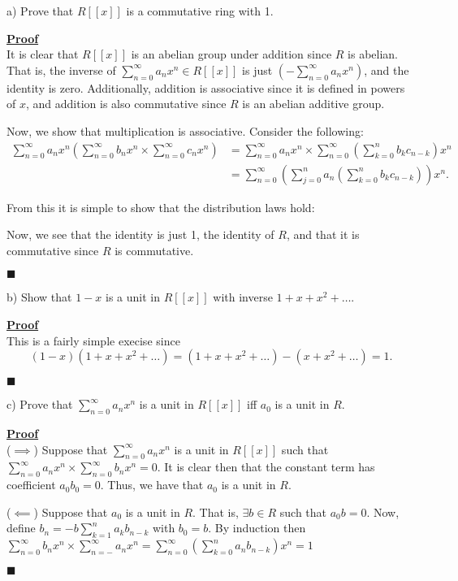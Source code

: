 \documentclass[12pt,a4paper]{article}
\newenvironment{proof}
{
\textbf{\underline{Proof}} \\
}
{
\begin{flushright}
$\blacksquare$
\end{flushright}}
\begin{document}
a) Prove that $R[[x]]$ is a commutative ring with 1.

\begin{proof}
    It is clear that $R[[x]]$ is an abelian group under addition since $R$ is abelian.
    That is, the inverse of $\sum_{n=0}^{\infty} a_n x^n \in R[[x]]$ is just $(-\sum_{n=0}^{\infty} a_n x^n)$, and the identity is zero. 
    Additionally, addition is associative since it is defined in powers of $x$, and addition is also commutative since $R$ is an abelian additive group.

    Now, we show that multiplication is associative.
    Consider the following:
    \begin{align*}
        \sum_{n=0}^{\infty} a_n x^n\left( \sum_{n=0}^{\infty} b_{n}x^{n} \times \sum_{n=0}^{\infty} c_{n}x^{n} \right) &= \sum_{n=0}^{\infty} a_n x^n \times \sum_{n=0}^{\infty} \left( \sum_{k=0}^{n} b_{k}c_{n-k} \right) x^{n} \\
        &= \sum_{n=0}^{\infty} \left( \sum_{j=0}^{n} a_n \left( \sum_{k=0}^{n} b_{k}c_{n-k} \right) \right) x^{n}
    .\end{align*}

    From this it is simple to show that the distribution laws hold:

    Now, we see that the identity is just 1, the identity of $R$, and that it is commutative since $R$ is commutative.
\end{proof}

b) Show that $1-x$ is a unit in $R[[x]]$ with inverse $1 + x + x^2 + \ldots$.

\begin{proof}
    This is a fairly simple execise since
    \[
        \left( 1-x \right)\left( 1 + x + x^2 + \ldots \right) = \left( 1 + x + x^2 + \ldots \right) - \left( x + x^2 + \ldots \right) = 1
    .\]
\end{proof}

c) Prove that $\sum_{n=0}^{\infty} a_n x^n$ is a unit in $R[[x]]$ iff $a_0$ is a unit in $R$.

\begin{proof}
    ($\implies$) Suppose that $\sum_{n=0}^{\infty} a_n x^n$ is a unit in $R[[x]]$ such that $\sum_{n=0}^{\infty} a_n x^n \times \sum_{n=0}^{\infty} b_{n}x^{n} = 0$. 
    It is clear then that the constant term has coefficient $a_0b_0 = 0$. 
    Thus, we have that $a_0$ is a unit in $R$.


    ($\impliedby$) Suppose that $a_0$ is a unit in $R$. 
    That is, $\exists b \in R$ such that $a_0b = 0$. 
    Now, define $b_{n} = -b\sum_{k=1}^{n} a_{k}b_{n-k}$ with $b_0 = b$.
    By induction then $\sum_{n=0}^{\infty} b_{n}x^{n} \times \sum_{n=-}^{\infty} a_n x^n = \sum_{n=0}^{\infty} \left( \sum_{k=0}^{n} a_n b_{n-k} \right) x^{n} = 1$ 
\end{proof}
\end{document}
